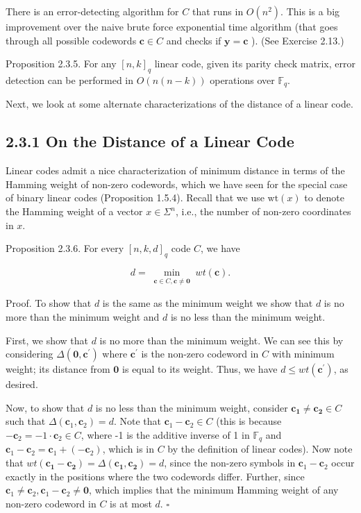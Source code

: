 \documentclass[10pt]{article}
\begin{document}
There is an error-detecting algorithm for $C$ that runs in $O\left(n^{2}\right)$. This is a big improvement over the naive brute force exponential time algorithm (that goes through all possible codewords $\mathbf{c} \in C$ and checks if $\mathbf{y}=\mathbf{c}$ ). (See Exercise 2.13.)

Proposition 2.3.5. For any $[n, k]_{q}$ linear code, given its parity check matrix, error detection can be performed in $O(n(n-k))$ operations over $\mathbb{F}_{q}$.

Next, we look at some alternate characterizations of the distance of a linear code.

\subsection*{2.3.1 On the Distance of a Linear Code}
Linear codes admit a nice characterization of minimum distance in terms of the Hamming weight of non-zero codewords, which we have seen for the special case of binary linear codes (Proposition 1.5.4). Recall that we use $\mathrm{wt}(x)$ to denote the Hamming weight of a vector $x \in \Sigma^{n}$, i.e., the number of non-zero coordinates in $x$.

Proposition 2.3.6. For every $[n, k, d]_{q}$ code $C$, we have

$$
d=\min _{\substack{\mathbf{c} \in C, \mathbf{c} \neq \mathbf{0}}} w t(\mathbf{c}) .
$$

Proof. To show that $d$ is the same as the minimum weight we show that $d$ is no more than the minimum weight and $d$ is no less than the minimum weight.

First, we show that $d$ is no more than the minimum weight. We can see this by considering $\Delta\left(\mathbf{0}, \mathbf{c}^{\prime}\right)$ where $\mathbf{c}^{\prime}$ is the non-zero codeword in $C$ with minimum weight; its distance from $\mathbf{0}$ is equal to its weight. Thus, we have $d \leq w t\left(\mathbf{c}^{\prime}\right)$, as desired.

Now, to show that $d$ is no less than the minimum weight, consider $\mathbf{c}_{\mathbf{1}} \neq \mathbf{c}_{\mathbf{2}} \in C$ such that $\Delta\left(\mathbf{c}_{1}, \mathbf{c}_{2}\right)=d$. Note that $\mathbf{c}_{1}-\mathbf{c}_{2} \in C$ (this is because $-\mathbf{c}_{2}=-1 \cdot \mathbf{c}_{2} \in C$, where -1 is the additive inverse of 1 in $\mathbb{F}_{q}$ and $\mathbf{c}_{1}-\mathbf{c}_{2}=\mathbf{c}_{1}+\left(-\mathbf{c}_{2}\right)$, which is in $C$ by the definition of linear codes). Now note that $w t\left(\mathbf{c}_{\mathbf{1}}-\mathbf{c}_{\mathbf{2}}\right)=\Delta\left(\mathbf{c}_{\mathbf{1}}, \mathbf{c}_{\mathbf{2}}\right)=d$, since the non-zero symbols in $\mathbf{c}_{1}-\mathbf{c}_{2}$ occur exactly in the positions where the two codewords differ. Further, since $\mathbf{c}_{1} \neq \mathbf{c}_{2}, \mathbf{c}_{1}-\mathbf{c}_{2} \neq \mathbf{0}$, which implies that the minimum Hamming weight of any non-zero codeword in $C$ is at most $d$. \(\square\)
\end{document}
